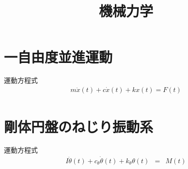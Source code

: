 \documentclass[a4paper]{jsarticle}
\author{}
\title{機械力学}
\date{}
\begin{document}
\maketitle
\tableofcontents
\newpage

\section{一自由度並進運動}
\begin{itembox}[l]{運動方程式}
    \begin{eqnarray*}
        m\ddot{x}\left(t\right)+c\dot{x}\left(t\right)+kx\left(t\right)=F\left(t\right)\\
    \end{eqnarray*}
\end{itembox}
\section{剛体円盤のねじり振動系}
\begin{itembox}[l]{運動方程式}
    \begin{eqnarray*}
        I\ddot{\theta}\left(t\right)+c_\theta\dot{\theta}\left(t\right)+k_\theta\theta\left(t\right)&=&M\left(t\right)\\
    \end{eqnarray*}
\end{itembox}
\end{document}
